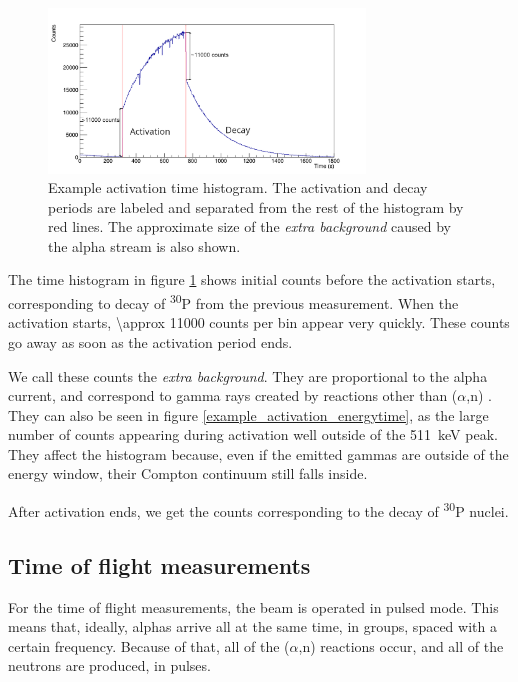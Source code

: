 \documentclass[a4paper,12pt]{report}
\newcommand{\an}{($\alpha$,n) }
\newcommand{\Piso}{\textsuperscript{30}P }
\begin{document}
\begin{figure}[H]
	\centering
	\includegraphics[width=0.75\textwidth]{example_activation_time_histogram.png}
	\caption{Example activation time histogram.
	The activation and decay periods are labeled and separated from the rest of the histogram by red lines.
	The approximate size of the \textit{extra background} caused by the alpha stream is also shown.}
	\label{example_activation_time_histogram}
\end{figure}

The time histogram in figure \ref{example_activation_time_histogram} shows initial counts before the activation starts, corresponding to decay of \Piso from the previous measurement.
When the activation starts, \num{\approx 11000} counts per bin appear very quickly.
These counts go away as soon as the activation period ends.

We call these counts the \textit{extra background}.
They are proportional to the alpha current, and correspond to gamma rays created by reactions other than \an.
They can also be seen in figure \ref{example_activation_energytime}, as the large number of counts appearing during activation well outside of the \qty{511}{\keV} peak.
They affect the histogram because, even if the emitted gammas are outside of the energy window, their Compton continuum still falls inside.

After activation ends, we get the counts corresponding to the decay of \Piso nuclei.

\subsection{Time of flight measurements}
For the time of flight measurements, the beam is operated in pulsed mode.
This means that, ideally, alphas arrive all at the same time, in groups, spaced with a certain frequency.	%
Because of that, all of the \an reactions occur, and all of the neutrons are produced, in pulses.
\\
\end{document}

